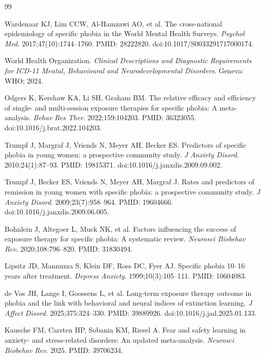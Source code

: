 \documentclass[9pt,twocolumn]{article}
\begin{document}
\begin{thebibliography}{99}

Wardenaar KJ, Lim CCW, Al-Hamzawi AO, et al. The cross-national epidemiology of specific phobia in the World Mental Health Surveys. \emph{Psychol Med}. 2017;47(10):1744--1760. PMID: 28222820. doi:10.1017/S0033291717000174.

World Health Organization. \emph{Clinical Descriptions and Diagnostic Requirements for ICD-11 Mental, Behavioural and Neurodevelopmental Disorders}. Geneva: WHO; 2024.

Odgers K, Kershaw KA, Li SH, Graham BM. The relative efficacy and efficiency of single- and multi-session exposure therapies for specific phobia: A meta-analysis. \emph{Behav Res Ther}. 2022;159:104203. PMID: 36323055. doi:10.1016/j.brat.2022.104203.

Trumpf J, Margraf J, Vriends N, Meyer AH, Becker ES. Predictors of specific phobia in young women: a prospective community study. \emph{J Anxiety Disord}. 2010;24(1):87--93. PMID: 19815371. doi:10.1016/j.janxdis.2009.09.002.

Trumpf J, Becker ES, Vriends N, Meyer AH, Margraf J. Rates and predictors of remission in young women with specific phobia: a prospective community study. \emph{J Anxiety Disord}. 2009;23(7):958--964. PMID: 19604666. doi:10.1016/j.janxdis.2009.06.005.

Bohnlein J, Altegoer L, Muck NK, et al. Factors influencing the success of exposure therapy for specific phobia: A systematic review. \emph{Neurosci Biobehav Rev}. 2020;108:796--820. PMID: 31830494.

Lipsitz JD, Mannuzza S, Klein DF, Ross DC, Fyer AJ. Specific phobia 10--16 years after treatment. \emph{Depress Anxiety}. 1999;10(3):105--111. PMID: 10604083.

de Vos JH, Lange I, Goossens L, et al. Long-term exposure therapy outcome in phobia and the link with behavioral and neural indices of extinction learning. \emph{J Affect Disord}. 2025;375:324--330. PMID: 39889926. doi:10.1016/j.jad.2025.01.133.

Kausche FM, Carsten HP, Sobania KM, Riesel A. Fear and safety learning in anxiety- and stress-related disorders: An updated meta-analysis. \emph{Neurosci Biobehav Rev}. 2025. PMID: 39706234.


\end{thebibliography}
\end{document}

